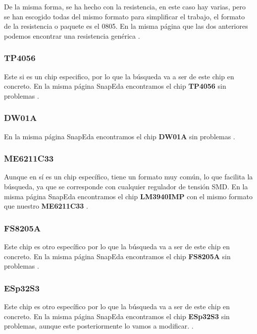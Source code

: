 De la misma forma, se ha hecho con la resistencia, en este caso hay varias, pero se han escogido todas del mismo formato para simplificar el trabajo, el formato de la resistencia o paquete es el 0805. En la misma página que las dos anteriores podemos encontrar una resistencia genérica \cite{SnapedaRes}.

\subsubsection{TP4056}

Este si es un chip especifico, por lo que la búsqueda va a ser de este chip en concreto. En la misma página SnapEda \cite{Snapeda} encontramos el chip \textbf{TP4056} sin problemas \cite{SnapedaTP4056}.

\subsubsection{DW01A}

En la misma página SnapEda \cite{Snapeda} encontramos el chip \textbf{DW01A} sin problemas \cite{SnapedaDW01A}.

\subsubsection{ME6211C33}

Aunque en sí es un chip específico, tiene un formato muy común, lo que facilita la búsqueda, ya que se corresponde con cualquier regulador de tensión \gls{SMD}. En la misma página SnapEda \cite{Snapeda} encontramos el chip \textbf{LM3940IMP} con el mismo formato que nuestro \textbf{ME6211C33} \cite{SnapedaME6211C33}.

\subsubsection{FS8205A}

Este chip es otro específico por lo que la búsqueda va a ser de este chip en concreto. En la misma página SnapEda \cite{Snapeda} encontramos el chip \textbf{FS8205A} sin problemas \cite{SnapedaFS8205A}.

\subsubsection{ESp32S3} \label{ESp32S3BusquedaComponente}

Este chip es otro específico por lo que la búsqueda va a ser de este chip en concreto. En la misma página SnapEda \cite{Snapeda} encontramos el chip \textbf{ESp32S3} sin problemas, aunque este posteriormente lo vamos a modificar. \cite{SnapedaESp32S3}.

